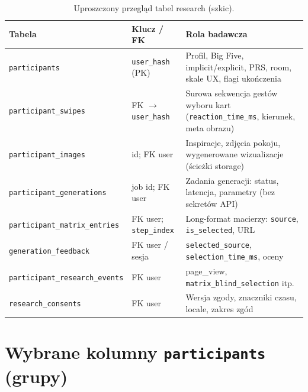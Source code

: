 \begin{table}[htbp]
  \centering
  \footnotesize
  \setlength{\tabcolsep}{4pt}
  \caption{Uproszczony przegląd tabel research (szkic).}
  \label{tab:app:a:tables}
  \begin{tabular}{@{}>{\raggedright\arraybackslash}p{}>{\raggedright\arraybackslash}p{}>{\raggedright\arraybackslash}p{}@{}}
    \toprule
    Tabela & Klucz / FK & Rola badawcza \\
    \midrule
    \texttt{participants} &
      \texttt{user\_hash} (PK) &
      Profil, Big Five, implicit/explicit, PRS, room, skale UX, flagi ukończenia \\
    \texttt{participant\_swipes} &
      FK $\rightarrow$ \texttt{user\_hash} &
      Surowa sekwencja gestów wyboru kart (\texttt{reaction\_time\_ms}, kierunek, meta obrazu) \\
    \texttt{participant\_images} &
      id; FK user &
      Inspiracje, zdjęcia pokoju, wygenerowane wizualizacje (ścieżki storage) \\
    \texttt{participant\_generations} &
      job id; FK user &
      Zadania generacji: status, latencja, parametry (bez sekretów API) \\
    \texttt{participant\_matrix\_entries} &
      FK user; \texttt{step\_index} &
      Long-format macierzy: \texttt{source}, \texttt{is\_selected}, URL \\
    \texttt{generation\_feedback} &
      FK user / sesja &
      \texttt{selected\_source}, \texttt{selection\_time\_ms}, oceny \\
    \texttt{participant\_research\_events} &
      FK user &
      page\_view, \texttt{matrix\_blind\_selection} itp. \\
    \texttt{research\_consents} &
      FK user &
      Wersja zgody, znaczniki czasu, locale, zakres zgód \\
    \bottomrule
  \end{tabular}
\end{table}

\section{Wybrane kolumny \texttt{participants} (grupy)}
\label{app:a:sec:participants}

